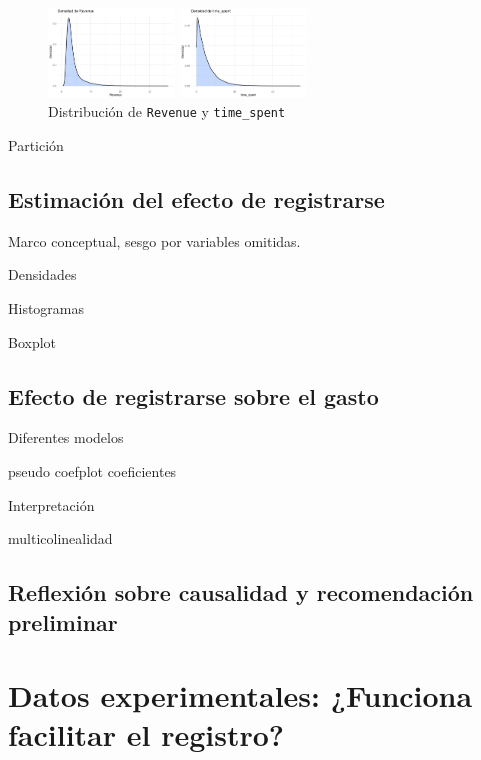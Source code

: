 \documentclass[conference]{IEEEtran}
\begin{document}
\begin{figure}[H]
    \centering
    \includegraphics[width=0.3\textwidth]{figures/revenueA.png}

    \includegraphics[width=0.3\textwidth]{figures/timespentA.png}
    \caption{Distribución de \texttt{Revenue} y \texttt{time\_spent}}
    \label{fig:distribucion}
\end{figure}


Partición


\subsection{Estimación del efecto de registrarse}

Marco conceptual, sesgo por variables omitidas.


Densidades

Histogramas

Boxplot

\subsection{Efecto de registrarse sobre el gasto}


Diferentes modelos

pseudo coefplot coeficientes

Interpretación

multicolinealidad


\subsection{Reflexión sobre causalidad y recomendación preliminar}


\section{Datos experimentales: ¿Funciona facilitar el registro?}
\end{document}

